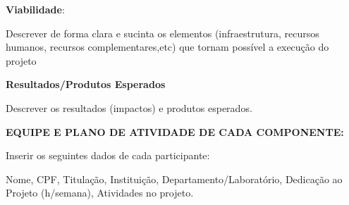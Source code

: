\documentclass[a4paper]{article}
\begin{document}
\textbf{Viabilidade}:

Descrever de forma clara e sucinta os elementos (infraestrutura, recursos humanos, recursos complementares,etc) que tornam possível a execução do projeto 

\vfill
\textbf{Resultados/Produtos Esperados}

Descrever os resultados (impactos) e produtos esperados.

\vfill

\textbf{EQUIPE E PLANO DE ATIVIDADE DE CADA COMPONENTE:}

Inserir os seguintes dados de cada participante:

Nome, CPF, Titulação, Instituição, Departamento/Laboratório, Dedicação ao Projeto (h/semana), Atividades no projeto.




\end{document}
